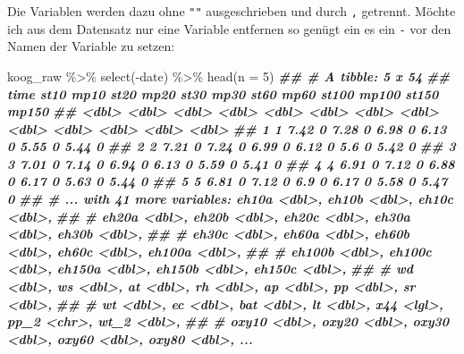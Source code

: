 \documentclass[
]{article}
\newenvironment{Shaded}{\begin{snugshade}}{\end{snugshade}}
\newcommand{\AttributeTok}[1]{\textcolor[rgb]{0.77,0.63,0.00}{#1}}
\newcommand{\DecValTok}[1]{\textcolor[rgb]{0.00,0.00,0.81}{#1}}
\newcommand{\DocumentationTok}[1]{\textcolor[rgb]{0.56,0.35,0.01}{\textbf{\textit{#1}}}}
\newcommand{\FunctionTok}[1]{\textcolor[rgb]{0.00,0.00,0.00}{#1}}
\newcommand{\NormalTok}[1]{#1}
\newcommand{\SpecialCharTok}[1]{\textcolor[rgb]{0.00,0.00,0.00}{#1}}
\begin{document}
Die Variablen werden dazu ohne \texttt{""} ausgeschrieben und durch \texttt{,} getrennt. Möchte ich aus dem Datensatz nur eine Variable entfernen so genügt ein es ein \texttt{-} vor den Namen der Variable zu setzen:

\begin{Shaded}
\begin{Highlighting}[]
\NormalTok{koog\_raw }\SpecialCharTok{\%\textgreater{}\%}
  \FunctionTok{select}\NormalTok{(}\SpecialCharTok{{-}}\NormalTok{date) }\SpecialCharTok{\%\textgreater{}\%}
  \FunctionTok{head}\NormalTok{(}\AttributeTok{n =} \DecValTok{5}\NormalTok{)}
\DocumentationTok{\#\# \# A tibble: 5 x 54}
\DocumentationTok{\#\#    time  st10  mp10  st20  mp20  st30  mp30  st60  mp60 st100 mp100 st150 mp150}
\DocumentationTok{\#\#   \textless{}dbl\textgreater{} \textless{}dbl\textgreater{} \textless{}dbl\textgreater{} \textless{}dbl\textgreater{} \textless{}dbl\textgreater{} \textless{}dbl\textgreater{} \textless{}dbl\textgreater{} \textless{}dbl\textgreater{} \textless{}dbl\textgreater{} \textless{}dbl\textgreater{} \textless{}dbl\textgreater{} \textless{}dbl\textgreater{} \textless{}dbl\textgreater{}}
\DocumentationTok{\#\# 1     1  7.42     0  7.28     0  6.98     0  6.13     0  5.55     0  5.44     0}
\DocumentationTok{\#\# 2     2  7.21     0  7.24     0  6.99     0  6.12     0  5.6      0  5.42     0}
\DocumentationTok{\#\# 3     3  7.01     0  7.14     0  6.94     0  6.13     0  5.59     0  5.41     0}
\DocumentationTok{\#\# 4     4  6.91     0  7.12     0  6.88     0  6.17     0  5.63     0  5.44     0}
\DocumentationTok{\#\# 5     5  6.81     0  7.12     0  6.9      0  6.17     0  5.58     0  5.47     0}
\DocumentationTok{\#\# \# ... with 41 more variables: eh10a \textless{}dbl\textgreater{}, eh10b \textless{}dbl\textgreater{}, eh10c \textless{}dbl\textgreater{},}
\DocumentationTok{\#\# \#   eh20a \textless{}dbl\textgreater{}, eh20b \textless{}dbl\textgreater{}, eh20c \textless{}dbl\textgreater{}, eh30a \textless{}dbl\textgreater{}, eh30b \textless{}dbl\textgreater{},}
\DocumentationTok{\#\# \#   eh30c \textless{}dbl\textgreater{}, eh60a \textless{}dbl\textgreater{}, eh60b \textless{}dbl\textgreater{}, eh60c \textless{}dbl\textgreater{}, eh100a \textless{}dbl\textgreater{},}
\DocumentationTok{\#\# \#   eh100b \textless{}dbl\textgreater{}, eh100c \textless{}dbl\textgreater{}, eh150a \textless{}dbl\textgreater{}, eh150b \textless{}dbl\textgreater{}, eh150c \textless{}dbl\textgreater{},}
\DocumentationTok{\#\# \#   wd \textless{}dbl\textgreater{}, ws \textless{}dbl\textgreater{}, at \textless{}dbl\textgreater{}, rh \textless{}dbl\textgreater{}, ap \textless{}dbl\textgreater{}, pp \textless{}dbl\textgreater{}, sr \textless{}dbl\textgreater{},}
\DocumentationTok{\#\# \#   wt \textless{}dbl\textgreater{}, ec \textless{}dbl\textgreater{}, bat \textless{}dbl\textgreater{}, lt \textless{}dbl\textgreater{}, x44 \textless{}lgl\textgreater{}, pp\_2 \textless{}chr\textgreater{}, wt\_2 \textless{}dbl\textgreater{},}
\DocumentationTok{\#\# \#   oxy10 \textless{}dbl\textgreater{}, oxy20 \textless{}dbl\textgreater{}, oxy30 \textless{}dbl\textgreater{}, oxy60 \textless{}dbl\textgreater{}, oxy80 \textless{}dbl\textgreater{}, ...}
\end{Highlighting}
\end{Shaded}
\end{document}
